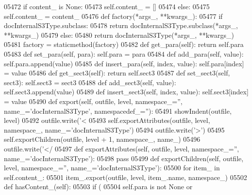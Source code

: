 \begin{DoxyCode}
{{{{{{{{{{{{{{{{{{{{{{{{{{{{{{{{{{{{{{{{{{{{{{{{{{{{{{{{{{{{{{{{{{{{{{{{{{{{{{{{{{{{{{{{{{{{{{{{{{{{{{{{{{{{{{{{{{{{{{{{{{{{{{{{{{{{{{{{{{{{{{{{{{{{{{{{{{{{{{{{{{{{{{{{{{{{{{{{{{{{{{{{{{{{{{{{{{{{{{{{{{{{{{{{{{{{{{{{{{{{{{{{{{{{{{{{{{{{{{{{{{{{{{{{{{{{{{{{{{{{{{{{{{{{{{{{{{{{{{{{{{{{{{{{{{{{{{{{{{{{{{{{{{{{{{{{{{{{{{{{{{{{{{{{{{{{{{{{{{{{{{05472         \textcolor{keywordflow}{if} content\_ \textcolor{keywordflow}{is} \textcolor{keywordtype}{None}:
05473             self.content_ = []
05474         \textcolor{keywordflow}{else}:
05475             self.content_ = content\_
05476     \textcolor{keyword}{def }factory(*args\_, **kwargs\_):
05477         \textcolor{keywordflow}{if} docInternalS3Type.subclass:
05478             \textcolor{keywordflow}{return} docInternalS3Type.subclass(*args\_, **kwargs\_)
05479         \textcolor{keywordflow}{else}:
05480             \textcolor{keywordflow}{return} docInternalS3Type(*args\_, **kwargs\_)
05481     factory = staticmethod(factory)
05482     \textcolor{keyword}{def }get_para(self): \textcolor{keywordflow}{return} self.para
05483     \textcolor{keyword}{def }set_para(self, para): self.para = para
05484     \textcolor{keyword}{def }add_para(self, value): self.para.append(value)
05485     \textcolor{keyword}{def }insert_para(self, index, value): self.para[index] = value
05486     \textcolor{keyword}{def }get_sect3(self): \textcolor{keywordflow}{return} self.sect3
05487     \textcolor{keyword}{def }set_sect3(self, sect3): self.sect3 = sect3
05488     \textcolor{keyword}{def }add_sect3(self, value): self.sect3.append(value)
05489     \textcolor{keyword}{def }insert_sect3(self, index, value): self.sect3[index] = value
05490     \textcolor{keyword}{def }export(self, outfile, level, namespace\_='', name\_='docInternalS3Type', namespacedef\_=''):
05491         showIndent(outfile, level)
05492         outfile.write(\textcolor{stringliteral}{'<%
05493         self.exportAttributes(outfile, level, namespace\_, name\_=\textcolor{stringliteral}{'docInternalS3Type'})
05494         outfile.write(\textcolor{stringliteral}{'>'})
05495         self.exportChildren(outfile, level + 1, namespace\_, name\_)
05496         outfile.write(\textcolor{stringliteral}{'</%
05497     \textcolor{keyword}{def }exportAttributes(self, outfile, level, namespace\_='', name\_='docInternalS3Type'):
05498         \textcolor{keywordflow}{pass}
05499     \textcolor{keyword}{def }exportChildren(self, outfile, level, namespace\_='', name\_='docInternalS3Type'):
05500         \textcolor{keywordflow}{for} item\_ \textcolor{keywordflow}{in} self.content\_:
05501             item\_.export(outfile, level, item\_.name, namespace\_)
05502     \textcolor{keyword}{def }hasContent_(self):
05503         \textcolor{keywordflow}{if} (
05504             self.para \textcolor{keywordflow}{is} \textcolor{keywordflow}{not} \textcolor{keywordtype}{None} \textcolor{keywordflow}{or}
}}}}}}}}}}}}}}}}}}}}}}}}}}}}}}}}}}}}}}}}}}}}}}}}}}}}}}}}}}}}}}}}}}}}}}}}}}}}}}}}}}}}}}}}}}}}}}}}}}}}}}}}}}}}}}}}}}}}}}}}}}}}}}}}}}}}}}}}}}}}}}}}}}}}}}}}}}}}}}}}}}}}}}}}}}}}}}}}}}}}}}}}}}}}}}}}}}}}}}}}}}}}}}}}}}}}}}}}}}}}}}}}}}}}}}}}}}}}}}}}}}}}}}}}}}}}}}}}}}}}}}}}}}}}}}}}}}}}}}}}}}}}}}}}}}}}}}}}}}}}}}}}}}}}}}}}}}}}}}}}}}}}}}}}}}}}}}}}}}}}}}}}
\end{DoxyCode}
